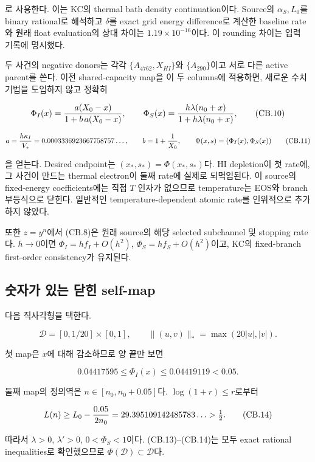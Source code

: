 \documentclass[11pt,a4paper]{article}
\begin{document}
로 사용한다. 이는 KC의 thermal bath density continuation이다. Source의 \(\alpha_S,L_0\)를 binary rational로 해석하고 \(\delta\)를 exact grid energy difference로 계산한 baseline rate와 원래 float evaluation의 상대 차이는 \(1.19\times10^{-16}\)이다. 이 rounding 차이는 입력 기록에 명시했다.

두 사건의 negative donors는 각각 \(\{A_{4762},X_{HI}\}\)와 \(\{A_{290}\}\)이고 서로 다른 active parent를 쓴다. 이전 shared-capacity map을 이 두 columns에 적용하면, 새로운 수치기법을 도입하지 않고 정확히

\[
 \Phi_I(x)={a(X_0-x)\over1+b\,a(X_0-x)},\qquad
 \Phi_S(x)={h\lambda(n_0+x)\over1+h\lambda(n_0+x)},
 \tag{CB.10}
\]

\[
 a={h\kappa_I\over V_*}=0.0003336923667758757\ldots,
 \qquad b=1+{1\over X_0},\qquad
 \Phi(x,s)=(\Phi_I(x),\Phi_S(x))
 \tag{CB.11}
\]

을 얻는다. Desired endpoint는 \((x_*,s_*)=\Phi(x_*,s_*)\)다. HI depletion이 첫 rate에, 그 사건이 만드는 thermal electron이 둘째 rate에 실제로 되먹임된다. 이 source의 fixed-energy coefficients에는 직접 \(T\) 인자가 없으므로 temperature는 EOS와 branch 부등식으로 닫힌다. 일반적인 temperature-dependent atomic rate를 인위적으로 추가하지 않았다.

또한 \(z=y^n\)에서 (CB.8)은 원래 source의 해당 selected subchannel 및 stopping rate다. \(h\to0\)이면 \(\Phi_I=h f_I+O(h^2)\), \(\Phi_S=h f_S+O(h^2)\)이고, KC의 fixed-branch first-order consistency가 유지된다.

\hypertarget{uxc22buxc790uxac00-uxc788uxb294-uxb2ebuxd78c-self-map}{%
\subsection{숫자가 있는 닫힌 self-map}\label{uxc22buxc790uxac00-uxc788uxb294-uxb2ebuxd78c-self-map}}

다음 직사각형을 택한다.

\[
 \mathcal D=[0,1/20]\times[0,1],\qquad
 \|(u,v)\|_* =\max(20|u|,|v|).
 \tag{CB.12}
\]

첫 map은 \(x\)에 대해 감소하므로 양 끝만 보면

\[
 0.04417595
 \le\Phi_I(x)\le
 0.04419119
 <0.05.
 \tag{CB.13}
\]

둘째 map의 정의역은 \(n\in[n_0,n_0+0.05]\)다. \(\log(1+r)\le r\)로부터

\[
 L(n)\ge L_0-{0.05\over2n_0}
       =29.395109142485783\ldots>\tfrac12.
 \tag{CB.14}
\]

따라서 \(\lambda>0\), \(\lambda'>0\), \(0<\Phi_S<1\)이다. (CB.13)--(CB.14)는 모두 exact rational inequalities로 확인했으므로 \(\Phi(\mathcal D)\subset\mathcal D\)다.
\end{document}
